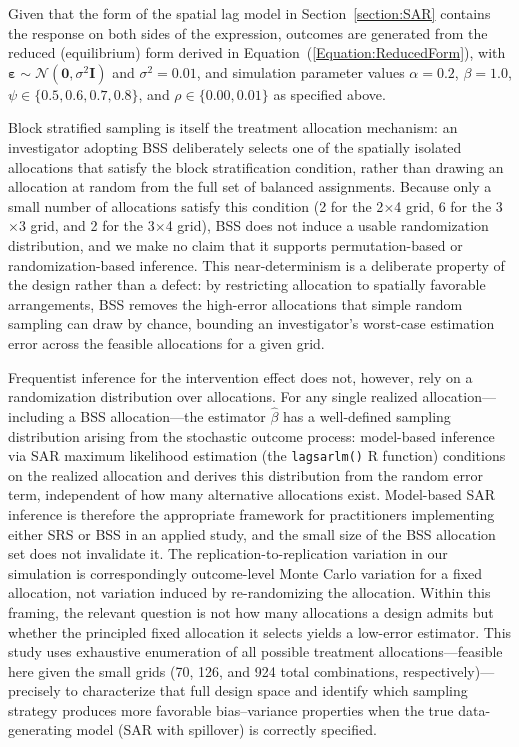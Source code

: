 \documentclass{article}[11pt]
\begin{document}
Given that the form of the spatial lag model in Section~\ref{section:SAR} contains the response on both sides of the expression, outcomes are generated from the reduced (equilibrium) form derived in Equation~(\ref{Equation:ReducedForm})\cite{fotheringham_sage_2009}\cite{baltagi_spatial_2003}, with $\boldsymbol\varepsilon \sim \mathcal{N}(\mathbf{0}, \sigma^2\mathbf{I})$ and $\sigma^2 = 0.01$, and simulation parameter values $\alpha = 0.2$, $\beta = 1.0$, $\psi \in \{0.5, 0.6, 0.7, 0.8\}$, and $\rho \in \{0.00, 0.01\}$ as specified above.


Block stratified sampling is itself the treatment allocation mechanism: an investigator adopting BSS deliberately selects one of the spatially isolated allocations that satisfy the block stratification condition, rather than drawing an allocation at random from the full set of balanced assignments. Because only a small number of allocations satisfy this condition (2 for the 2$\times$4 grid, 6 for the 3$\times$3 grid, and 2 for the 3$\times$4 grid), BSS does not induce a usable randomization distribution, and we make no claim that it supports permutation-based or randomization-based inference. This near-determinism is a deliberate property of the design rather than a defect: by restricting allocation to spatially favorable arrangements, BSS removes the high-error allocations that simple random sampling can draw by chance, bounding an investigator's worst-case estimation error across the feasible allocations for a given grid.

Frequentist inference for the intervention effect does not, however, rely on a randomization distribution over allocations. For any single realized allocation---including a BSS allocation---the estimator $\hat{\beta}$ has a well-defined sampling distribution arising from the stochastic outcome process: model-based inference via SAR maximum likelihood estimation (the \texttt{lagsarlm()} R function) conditions on the realized allocation and derives this distribution from the random error term, independent of how many alternative allocations exist. Model-based SAR inference is therefore the appropriate framework for practitioners implementing either SRS or BSS in an applied study, and the small size of the BSS allocation set does not invalidate it. The replication-to-replication variation in our simulation is correspondingly outcome-level Monte Carlo variation for a fixed allocation, not variation induced by re-randomizing the allocation. Within this framing, the relevant question is not how many allocations a design admits but whether the principled fixed allocation it selects yields a low-error estimator. This study uses exhaustive enumeration of all possible treatment allocations---feasible here given the small grids (70, 126, and 924 total combinations, respectively)---precisely to characterize that full design space and identify which sampling strategy produces more favorable bias--variance properties when the true data-generating model (SAR with spillover) is correctly specified.
\end{document}
